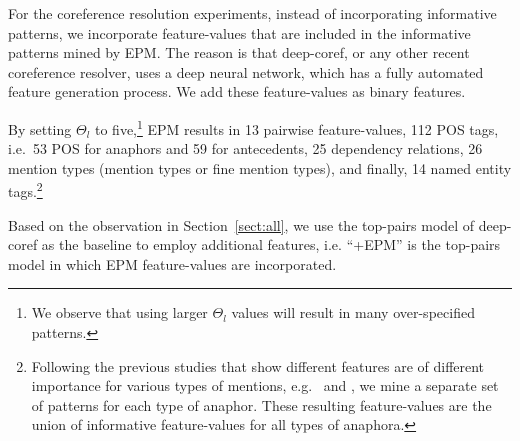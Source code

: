 For the coreference resolution experiments, instead of incorporating informative patterns, we incorporate feature-values that are included in the informative patterns mined by EPM.
The reason
is that deep-coref, or any other recent coreference resolver, uses a deep neural network,
which has a fully automated feature generation 
process.
We add these feature-values 
as binary features.

By setting $\Theta_l$ to five,\footnote{We observe that using larger $\Theta_l$ values will result in many over-specified patterns.} EPM results in 
13 pairwise feature-values,
112 POS tags, i.e.\ 53 POS for anaphors and 59 for antecedents,
25 dependency relations,
26 mention types (mention types or fine mention types),
and finally, 14 named entity tags.\footnote{Following the previous studies that show different features are of different importance for various types of mentions, e.g.\  and ,
we mine a separate set of patterns for each type of anaphor.
These resulting feature-values are the union of informative feature-values for all types of anaphora.}

Based on the observation in Section~\ref{sect:all}, we use the top-pairs model of deep-coref as the baseline to employ additional features, i.e. ``+EPM'' is the top-pairs model in which EPM feature-values are incorporated.

